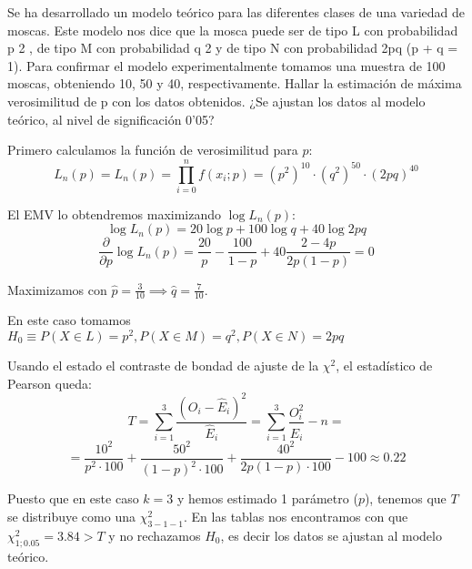 \begin{problem}[6] Se ha desarrollado un modelo teórico para las diferentes clases de una variedad de moscas. Este
modelo nos dice que la mosca puede ser de tipo L con probabilidad p
2
, de tipo M con probabilidad
q
2 y de tipo N con probabilidad 2pq (p + q = 1). Para confirmar el modelo experimentalmente
tomamos una muestra de 100 moscas, obteniendo 10, 50 y 40, respectivamente.
\ppart
Hallar la estimación de máxima verosimilitud de p con los datos obtenidos.
\ppart
¿Se ajustan los datos al modelo teórico, al nivel de significación 0’05?
\solution



\spart
Primero calculamos la función de verosimilitud para $p$:
\[L_n(p) = L_n(p) = \prod_{i=0}^n f(x_i;p) = (p^2)^{10} · (q^2)^{50} · (2pq)^{40}\]

El EMV lo obtendremos maximizando $\log L_n(p)$:
\[\log L_n(p) = 20 \log p + 100 \log q + 40 \log 2pq\]
\[\frac{\partial}{\partial p} \log L_n(p) = \frac{20}{p} - \frac{100}{1-p} + 40 \frac{2-4p}{2p(1-p)} = 0 \]

Maximizamos con $\hat{p}=\frac{3}{10} \implies \hat{q}=\frac{7}{10}$.

\spart
En este caso tomamos $H_0 \equiv P(X∈L)=p^2, P(X∈M)=q^2, P(X∈N)=2pq$

Usando el estado el contraste de bondad de ajuste de la $χ^2$, el estadístico de Pearson queda:
\[T = \sum_{i=1}^3 \frac{\left(O_i - \hat{E}_i\right)^2}{\hat{E}_i} = \sum_{i=1}^3 \frac{O_i^2}{\hat{E}_i} - n =\]
\[ = \frac{10^2}{p^2·100} + \frac{50^2}{(1-p)^2 · 100} + \frac{40^2}{2p(1-p)·100} - 100 ≈ 0.22\]

Puesto que en este caso $k=3$ y hemos estimado 1 parámetro ($p$), tenemos que $T$ se distribuye como una $χ^2_{3-1-1}$. En las tablas nos encontramos con que $χ^2_{1;0.05}=3.84 > T$ y no rechazamos $H_0$, es decir los datos se ajustan al modelo teórico.

\end{problem}
